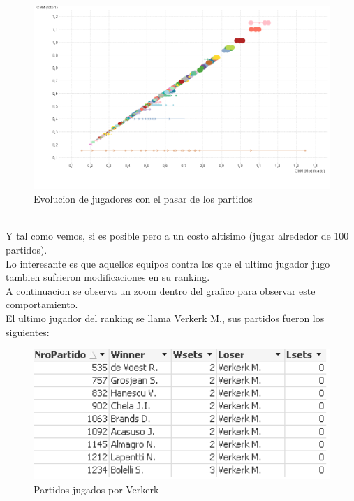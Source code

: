 \begin{figure}[H]
\centering
\includegraphics[width=1\textwidth]{IMG/comparativa cmm -cmm foto 100.png}
\caption{Evolucion de jugadores con el pasar de los partidos}
\label{fig:Evolucion de jugadores con el pasar de los partidos}
\end{figure}

\\
Y tal como vemos, si es posible pero a un costo altisimo (jugar alrededor de 100 partidos).
\\
Lo interesante es que aquellos equipos contra los que el ultimo jugador jugo tambien sufrieron modificaciones en su ranking. \\
A continuacion se observa un zoom dentro del grafico para observar este comportamiento.
\\

El ultimo jugador del ranking se llama Verkerk M., sus partidos fueron los siguientes:
\\
\begin{figure}[H]
\centering
\includegraphics[width=1\textwidth]{IMG/partidos jugados vs verkerk.png}
\caption{Partidos jugados por Verkerk}
\label{fig:Partidos jugados por Verkerk}
\end{figure}

